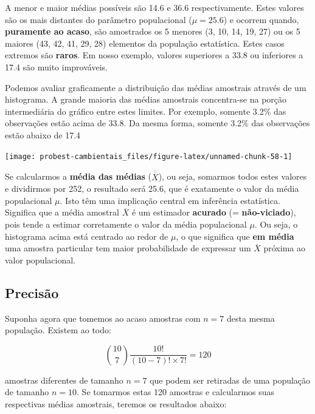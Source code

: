 \documentclass[
]{book}
\begin{document}
A menor e maior médias possíveis são 14.6 e 36.6 respectivamente. Estes valores são os mais distantes do parâmetro populacional (\(\mu = 25.6\)) e ocorrem quando, \textbf{puramente ao acaso}, são amostrados os 5 menores (3, 10, 14, 19, 27) ou os 5 maiores (43, 42, 41, 29, 28) elementos da população estatística. Estes casos extremos são \textbf{raros}. Em nosso exemplo, valores superiores a 33.8 ou inferiores a 17.4 são muito improváveis.

Podemos avaliar graficamente a distribuição das médias amostrais através de um histograma. A grande maioria das médias amostrais concentra-se na porção intermediária do gráfico entre estes limites. Por exemplo, somente 3.2\% das observações estão acima de 33.8. Da mesma forma, somente 3.2\% das observações estão abaixo de 17.4

\begin{center}\texttt{[image: probest-cambientais\_files/figure-latex/unnamed-chunk-58-1]} \end{center}

Se calcularmos a \textbf{média das médias} (\(\overline{\overline{X}}\)), ou seja, somarmos todos estes valores e dividirmos por 252, o resultado será 25.6, que é exatamente o valor da média populacional \(\mu\). Isto têm uma implicação central em inferência estatística. Significa que a média amostral \(\overline{X}\) é um estimador \textbf{acurado} (= \textbf{não-viciado}), pois tende a estimar corretamente o valor da média populacional \(\mu\). Ou seja, o histograma acima está centrado ao redor de \(\mu\), o que significa que \textbf{em média} uma amostra particular tem maior probabilidade de expressar um \(\overline{X}\) próxima ao valor populacional.

\hypertarget{precisuxe3o}{%
\subsection{Precisão}\label{precisuxe3o}}

Suponha agora que tomemos ao acaso amostras com \(n = 7\) desta mesma população. Existem ao todo:

\[{{10}\choose{7}} \frac{10!}{(10-7)! \times 7!} = 120\]

amostras diferentes de tamanho \(n = 7\) que podem ser retiradas de uma população de tamanho \(n = 10\). Se tomarmos estas 120 amostras e calcularmos suas respectivas médias amostrais, teremos os resultados abaixo:
\end{document}
